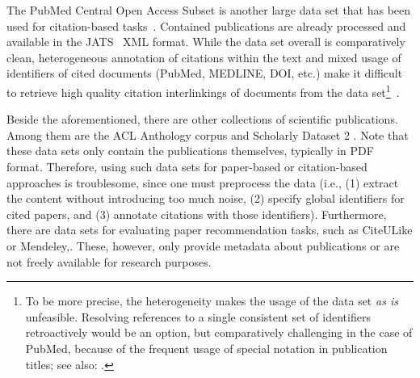 The PubMed Central Open Access Subset is another large data set that has been used for citation-based tasks~\cite{Gipp2015,Duma2016,Galke2018}. Contained publications are already processed and available in the JATS~\cite{Huh2014} XML format. While the data set overall is comparatively clean, heterogeneous annotation of citations within the text and mixed usage of identifiers of cited documents (PubMed, MEDLINE, DOI, etc.) make it difficult to retrieve high quality citation interlinkings of documents from the data set\footnote{To be more precise, the heterogeneity makes the usage of the data set \emph{as is} unfeasible. Resolving references to a single consistent set of identifiers retroactively would be an option, but comparatively challenging in the case of PubMed, because of the frequent usage of special notation in publication titles; see also: .}~\cite{Gipp2015}.

Beside the aforementioned, there are other collections of scientific publications. Among them are the ACL Anthology corpus \cite{Bird2008ACLARC} and Scholarly Dataset 2 \cite{Sugiyama2015}.
Note that these data sets only contain the publications themselves, typically in PDF format. Therefore, using such data sets for paper-based or citation-based approaches is troublesome, since one must preprocess the data (i.e., (1) extract the content without introducing too much noise, (2) specify global identifiers for cited papers, and (3) annotate citations with those identifiers).
Furthermore, there are data sets for evaluating paper recommendation tasks, such as CiteULike or Mendeley,. These, however, only provide metadata about publications or are not freely available for research purposes.

